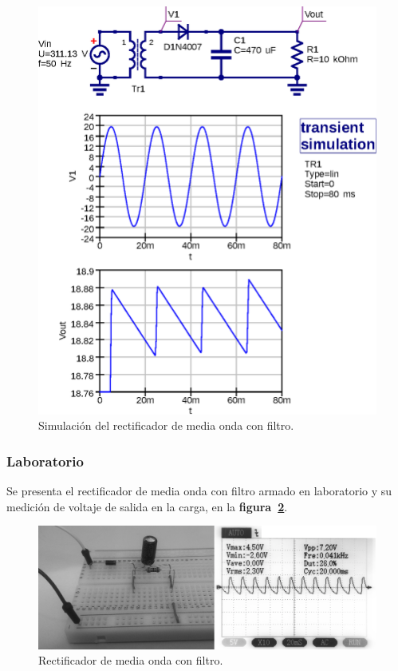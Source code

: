 \begin{figure}[!h]
\centering
\includegraphics[scale=0.75]{simulacion/05.media_onda2.eps}
\caption{Simulación del rectificador de media onda con filtro.}
\label{simulacion05}
\end{figure}

\subsubsection{Laboratorio}
Se presenta el rectificador de media onda con filtro armado en laboratorio y su
medición de voltaje de salida en la carga, en la
\textbf{figura~\ref{laboratorio07}}.

\begin{figure}[!h]
\centering
\includegraphics[scale=0.28]{fotos/05.media_onda2.eps}
\caption{Rectificador de media onda con filtro.}
\label{laboratorio07}
\end{figure}

